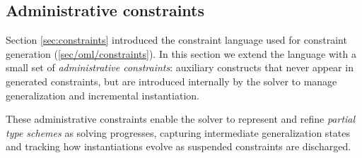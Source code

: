 \documentclass[acmsmall,screen,nonacm%
\Anonymous{,anonymous}{}%
\Final{}{,review}%
]{acmart}
\providecommand{\DIFaddbegin}{} %
\providecommand{\DIFaddend}{} %
\begin{document}
\subsection{Administrative constraints}
\DIFaddbegin \label{sec/solving/admin}
\DIFaddend 


Section \cref{sec:constraints} introduced the constraint language used for
constraint generation (\cref{sec/oml/constraints}). In this section we extend
the language with a small set of \emph{administrative constraints}: auxiliary
constructs that never appear in generated constraints, but are introduced
internally by the solver to manage generalization and incremental
instantiation.


These administrative constraints enable the solver to represent and refine
\emph{partial type schemes} as solving progresses, capturing intermediate
generalization states and tracking how instantiations evolve as suspended
constraints are discharged.
\end{document}
